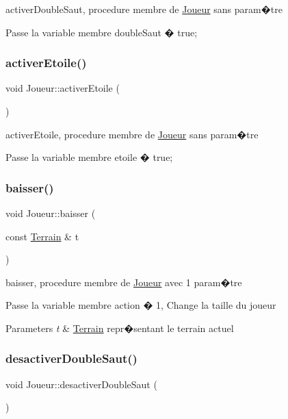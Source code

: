 activer\+Double\+Saut, procedure membre de \hyperlink{classJoueur}{Joueur} sans param�tre 

Passe la variable membre double\+Saut � true; \mbox{\label{classJoueur_abf3196f462694de76e7cda2a774e5fbd}} 
\subsubsection{\texorpdfstring{activer\+Etoile()}{activerEtoile()}}
{\footnotesize\ttfamily void Joueur\+::activer\+Etoile (\begin{DoxyParamCaption}{ }\end{DoxyParamCaption})}



activer\+Etoile, procedure membre de \hyperlink{classJoueur}{Joueur} sans param�tre 

Passe la variable membre etoile � true; \mbox{\label{classJoueur_ae8ad5ac90f26c39a93c03e1b039729cf}} 
\subsubsection{\texorpdfstring{baisser()}{baisser()}}
{\footnotesize\ttfamily void Joueur\+::baisser (\begin{DoxyParamCaption}\item[{const \hyperlink{classTerrain}{Terrain} \&}]{t }\end{DoxyParamCaption})}



baisser, procedure membre de \hyperlink{classJoueur}{Joueur} avec 1 param�tre 

Passe la variable membre action � 1, Change la taille du joueur 
\begin{DoxyParams}{Parameters}
{\em t} & \hyperlink{classTerrain}{Terrain} repr�sentant le terrain actuel \\
\hline
\end{DoxyParams}
\mbox{\label{classJoueur_a0c56fa459aaec50994d5e4c00b96155d}} 
\subsubsection{\texorpdfstring{desactiver\+Double\+Saut()}{desactiverDoubleSaut()}}
{\footnotesize\ttfamily void Joueur\+::desactiver\+Double\+Saut (\begin{DoxyParamCaption}{ }\end{DoxyParamCaption})}



